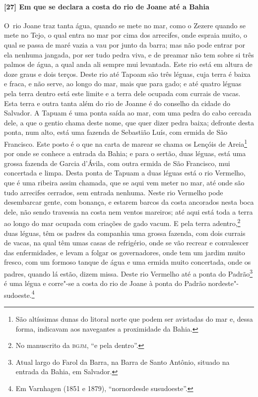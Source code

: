 \paragraph{[27] Em que se declara a costa do rio de Joane até a Bahia} \quad
\mbox{O rio} Joane traz tanta água, quando se mete no mar, como o Zezere quando se mete no Tejo,
o qual entra no mar por cima dos arrecifes, onde espraia muito, o qual se passa de maré
vazia a vau por junto da barra; mas não pode entrar por ela nenhuma jangada, por ser tudo
pedra viva, e de preamar não tem sobre si três palmos de água, a qual anda ali sempre mui
levantada. Este rio está em altura de doze graus e dois terços. Deste rio até Tapoam são
três léguas, cuja terra é baixa e fraca, e não serve, ao longo do mar, mais que para gado;
e até quatro léguas pela terra dentro está este limite e a terra dele ocupada com currais
de vacas. Esta terra e outra tanta além do rio de Joanne é do conselho da cidade do
Salvador. A Tapuam é uma ponta saída ao mar, com uma pedra do cabo cercada dele, a que o
gentio chama deste nome, que quer dizer pedra baixa; defronte desta ponta, num alto, está
uma fazenda de Sebastião Luís, com ermida de São Francisco. Este posto é o que na carta de
marear se chama os Lençóis de Areia\footnote{ São altíssimas dunas do litoral norte que
podem ser avistadas do mar e, dessa forma, indicavam aos navegantes a proximidade da
Bahia.} por onde se conhece a entrada da Bahia; e para o sertão, duas léguas, está uma
grossa fazenda de Garcia d'Ávila, com outra ermida de São Francisco, mui concertada e
limpa. Desta ponta de Tapuam a duas léguas está o rio Vermelho, que é uma ribeira assim
chamada, que se aqui vem meter no mar, até onde são tudo arrecifes cerrados, sem entrada
nenhuma. Neste rio Vermelho pode desembarcar gente, com bonança, e estarem barcos da costa
ancorados nesta boca dele, não sendo travessia na costa nem ventos mareiros; até aqui está
toda a terra ao longo do mar ocupada com criações de gado vacum. E pela terra
adentro,\footnote{ No manuscrito da \textsc{bgjm}, ``e pela dentro''.} duas léguas, têm os
padres da companhia uma grossa fazenda, com dois currais de vacas, na qual têm umas casas
de refrigério, onde se vão recrear e convalescer das enfermidades, e levam a folgar os
governadores, onde tem um jardim muito fresco, com um formoso tanque de água e uma ermida
muito concertada, onde os padres, quando lá estão, dizem missa. Deste rio Vermelho até a
ponta do Padrão\footnote{ Atual largo do Farol da Barra, na Barra de Santo Antônio,
situado na entrada da Bahia, em Salvador.} é uma légua e corre"-se a costa do rio de Joane
à ponta do Padrão nordeste"-sudoeste.\footnote{ Em Varnhagen (1851 e 1879), ``nornordesde
susudoeste''.}

